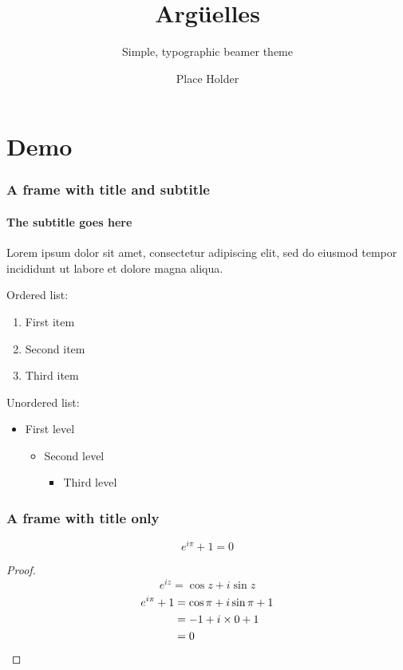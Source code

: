 \documentclass{beamer}
\title{Argüelles}
\subtitle{Simple, typographic beamer theme}
\date{}
\author{Place Holder}
\institute{University of \TeX\par\email{username@domain.com}}
\begin{document}
\frame[plain]{\titlepage}

\section{Demo}

\begin{frame}
 \frametitle{A frame with title and subtitle}
 \framesubtitle{The subtitle goes here}
 Lorem ipsum dolor sit amet, consectetur adipiscing elit, sed do eiusmod tempor incididunt ut labore et dolore magna aliqua.\par
 \vfill
 Ordered list:
 \begin{enumerate}
  \item First item
  \item Second item
  \item Third item
 \end{enumerate}
 \vfill
 Unordered list:
 \begin{itemize}
  \item First level
        \begin{itemize}
         \item Second level
               \begin{itemize}
                \item Third level
               \end{itemize}
        \end{itemize}
 \end{itemize}
\end{frame}

\begin{frame}
 \frametitle{A frame with title only}
 \begin{theorem}
  \[e^{i\pi}+1=0\]
  \begin{proof}
   \begin{equation*}
    e^{iz}=\cos{z}+i\sin{z}
   \end{equation*}
   \begin{align*}
    e^{i\pi}+1 & \null=\cos\pi+i\sin\pi+1 \\
               & \null=-1+i\times0+1      \\
               & \null=0
   \end{align*}
  \end{proof}
 \end{theorem}
\end{frame}
\end{document}
